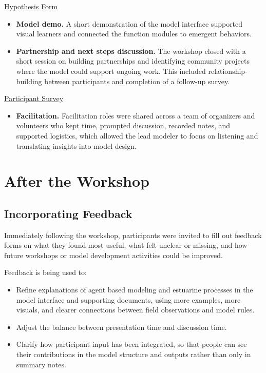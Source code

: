 \documentclass[
]{book}
\providecommand{\tightlist}{%
  \setlength{\itemsep}{0pt}\setlength{\parskip}{0pt}}
\begin{document}
\href{materials/Workshop_Hypothesis_Model_Form_45}{Hypothesis Form}

\begin{itemize}
\item
  \textbf{Model demo.} A short demonstration of the model interface supported visual learners and connected the function modules to emergent behaviors.
\item
  \textbf{Partnership and next steps discussion.} The workshop closed with a short session on building partnerships and identifying community projects where the model could support ongoing work. This included relationship-building between participants and completion of a follow-up survey.
\end{itemize}

\href{materials/Penobscot\%20Estuary\%20Workshop\%20Feedback\%20FollowUp_35.docx}{Participant Survey}

\begin{itemize}
\tightlist
\item
  \textbf{Facilitation.} Facilitation roles were shared across a team of organizers and volunteers who kept time, prompted discussion, recorded notes, and supported logistics, which allowed the lead modeler to focus on listening and translating insights into model design.
\end{itemize}

\section{After the Workshop}\label{after-the-workshop}

\subsection{Incorporating Feedback}\label{incorporating-feedback}

Immediately following the workshop, participants were invited to fill out feedback forms on what they found most useful, what felt unclear or missing, and how future workshops or model development activities could be improved.

Feedback is being used to:

\begin{itemize}
\item
  Refine explanations of agent based modeling and estuarine processes in the model interface and supporting documents, using more examples, more visuals, and clearer connections between field observations and model rules.
\item
  Adjust the balance between presentation time and discussion time.
\item
  Clarify how participant input has been integrated, so that people can see their contributions in the model structure and outputs rather than only in summary notes.
\end{itemize}
\end{document}
